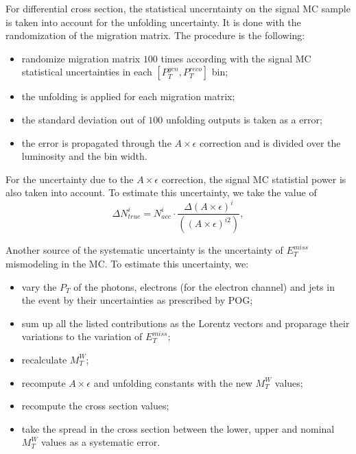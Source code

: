 For differential cross section, the statistical uncerntainty on the signal MC sample is taken into account for the unfolding uncertainty. It is done with the randomization of the migration matrix. The procedure is the following:
\begin{itemize}
  \item randomize migration matrix $100$ times according with the signal MC statistical uncertainties in each $[P_T^{gen},P_T^{reco}]$ bin;
  \item the unfolding is applied for each migration matrix;
  \item the standard deviation out of $100$ unfolding outputs is taken as a error;
  \item the error is propagated through the $A\times\epsilon$ correction and is divided over the luminosity and the bin width.
\end{itemize}


For the uncertainty due to the $A \times \epsilon$ correction, the signal MC statistial power is also taken into account. To estimate this uncertainty, we take the value of 
\begin{equation}
\Delta N_{true}^i= N_{acc}^i \cdot \frac{\Delta{(A\times \epsilon)^i}} { ((A\times \epsilon)^{i2})}, 
\end{equation}


Another source of the systematic uncertainty is the uncertainty of $E_T^{miss}$ mismodeling in the MC. To estimate this uncertainty, we:
\begin{itemize}
  \item vary the $P_T$ of the photons, electrons (for the electron channel) and jets in the event by their uncertainties as prescribed by POG;
  \item sum up all the listed contributions as the Lorentz vectors and proparage their variations to the variation of $E_T^{miss}$;
  \item recalculate $M_T^{W}$;
  \item recompute $A \times \epsilon$ and unfolding constants with the new $M_T^{W}$ values;
  \item recompute the cross section values;
  \item take the spread in the cross section between the lower, upper and nominal $M_T^{W}$ values as a systematic error.
\end{itemize}

